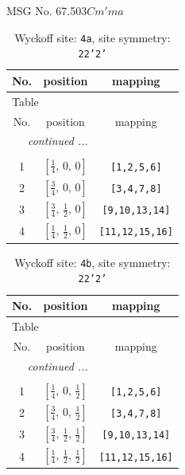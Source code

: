 \documentclass[fleqn,8pt]{jsarticle}
\begin{document}
\setcounter{MaxMatrixCols}{32}

\renewcommand{\tablename}{Table~}
\renewcommand{\figurename}{Figure~}
\begin{center}
\LARGE
MSG No. 67.503\quad$Cm'ma$
\end{center}
\renewcommand{\arraystretch}{1.2}
\begin{longtable}{ccc}
\caption{Wyckoff site: {\tt 4a}, site symmetry: {\tt 22'2'}}
 \\
 \hline \hline
No. & position & mapping \\ \hline \endfirsthead

\multicolumn{2}{l}{\tablename\ \thetable{}} \\
 \hline \hline
No. & position & mapping \\ \hline \endhead

 \hline \hline
\multicolumn{2}{r}{\footnotesize\it continued ...} \\ \endfoot

 \hline \hline
\multicolumn{2}{r}{} \\ \endlastfoot

1 & $\left[ \frac{1}{4},\, 0,\, 0 \right]$ & {\tt [1,2,5,6]} \\ \hline
2 & $\left[ \frac{3}{4},\, 0,\, 0 \right]$ & {\tt [3,4,7,8]} \\ \hline
3 & $\left[ \frac{3}{4},\, \frac{1}{2},\, 0 \right]$ & {\tt [9,10,13,14]} \\ \hline
4 & $\left[ \frac{1}{4},\, \frac{1}{2},\, 0 \right]$ & {\tt [11,12,15,16]} \\
\end{longtable}
\renewcommand{\arraystretch}{1.2}
\begin{longtable}{ccc}
\caption{Wyckoff site: {\tt 4b}, site symmetry: {\tt 22'2'}}
 \\
 \hline \hline
No. & position & mapping \\ \hline \endfirsthead

\multicolumn{2}{l}{\tablename\ \thetable{}} \\
 \hline \hline
No. & position & mapping \\ \hline \endhead

 \hline \hline
\multicolumn{2}{r}{\footnotesize\it continued ...} \\ \endfoot

 \hline \hline
\multicolumn{2}{r}{} \\ \endlastfoot

1 & $\left[ \frac{1}{4},\, 0,\, \frac{1}{2} \right]$ & {\tt [1,2,5,6]} \\ \hline
2 & $\left[ \frac{3}{4},\, 0,\, \frac{1}{2} \right]$ & {\tt [3,4,7,8]} \\ \hline
3 & $\left[ \frac{3}{4},\, \frac{1}{2},\, \frac{1}{2} \right]$ & {\tt [9,10,13,14]} \\ \hline
4 & $\left[ \frac{1}{4},\, \frac{1}{2},\, \frac{1}{2} \right]$ & {\tt [11,12,15,16]} \\
\end{longtable}
\end{document}
